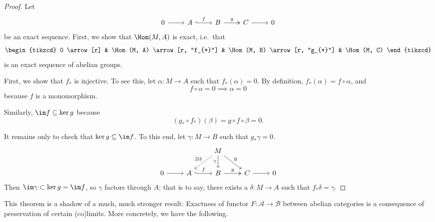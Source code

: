 \documentclass[main.tex]{subfiles}
\begin{document}
\begin{proof}
  Let
  \begin{equation*}
    \begin{tikzcd}
      0
      \arrow[r]
      & A
      \arrow[r, hookrightarrow, "f"]
      & B
      \arrow[r, twoheadrightarrow, "g"]
      & C
      \arrow[r]
      & 0
    \end{tikzcd}
  \end{equation*}
  be an exact sequence. First, we show that $\Hom(M, A)$ is exact, i.e.\ that
  \begin{equation*}
    \begin{tikzcd}
      0
      \arrow[r]
      & \Hom(M, A)
      \arrow[r, "f_{*}"]
      & \Hom(M, B)
      \arrow[r, "g_{*}"]
      & \Hom(M, C)
    \end{tikzcd}
  \end{equation*}
  is an exact sequence of abelian groups.

  First, we show that $f_{*}$ is injective. To see this, let $\alpha\colon M \to A$ such that $f_{*}(\alpha) = 0$. By definition, $f_{*}(\alpha) = f \circ \alpha$, and 
  \begin{equation*}
    f \circ \alpha = 0 \implies \alpha = 0
  \end{equation*}
  because $f$ is a monomorphism.

  Similarly, $\im f \subseteq \ker g$ because
  \begin{equation*}
    (g_{*} \circ f_{*})(\beta) = g \circ f \circ \beta = 0.
  \end{equation*}

  It remains only to check that $\ker g \subseteq \im f$. To this end, let $\gamma\colon M \to B$ such that $g_{*}\gamma = 0$.
  \begin{equation*}
    \begin{tikzcd}
      && M
      \arrow[d, swap, "\gamma"]
      \arrow[dr, "0"]
      \arrow[dl, swap, dashed, "\exists!\delta"]
      \\
      0
      \arrow[r]
      & A
      \arrow[r, hookrightarrow, "f"]
      & B
      \arrow[r, twoheadrightarrow, "g"]
      & C
      \arrow[r]
      & 0
    \end{tikzcd}
  \end{equation*}
  Then $\im \gamma \subset \ker g = \im f$, so $\gamma$ factors through $A$; that is to say, there exists a $\delta\colon M \to A$ such that $f_{*}\delta = \gamma$.
\end{proof}

This theorem is a shadow of a much, much stronger result: Exactness of functor $F\colon \mathcal{A} \to \mathcal{B}$ between abelian categories is a consequence of preservation of certain (co)limits. More concretely, we have the following.
\end{document}
